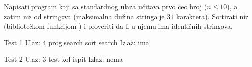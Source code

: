 \begin{Answer}[ref=522]
\end{Answer}
\begin{Exercise}[label=523]
  Napisati program koji sa standardnog ulaza učitava prvo ceo broj
   ($n \leq 10$), a zatim niz  od  stringova
  (maksimalna dužina stringa je $31$ karaktera). Sortirati niz
   (bibliotečkom funkcijom ) i proveriti da li u
  njemu ima identičnih stringova.
  
\begin{miditest}
\begin{test}{Test 1}
Ulaz:   4 prog search sort search
Izlaz:  ima
\end{test}
\end{miditest}
\begin{miditest}
\begin{test}{Test 2}
Ulaz:   3 test kol ispit
Izlaz:  nema
\end{test}
\end{miditest}
  
\end{Exercise}

